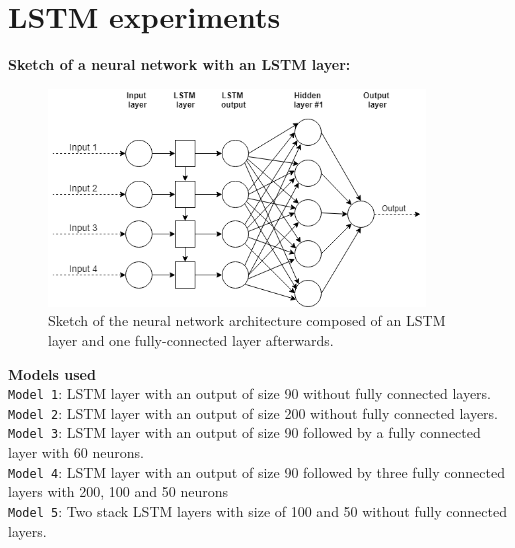 \chapter{LSTM experiments}
\label{annex:lstm-experiments}


\textbf{Sketch of a neural network with an LSTM layer:}
\begin{figure}[h]
    \centering
    \includegraphics[width=10cm]{images/nn-sketch-lstm.png}
    \caption[Sketch of a Neural Network with a LSTM layer]{Sketch of the neural network architecture composed of an LSTM layer and one fully-connected layer afterwards.}
    \label{fig-annex:nn-sketch-lstm}
\end{figure}

\noindent\textbf{Models used}\\
\texttt{Model 1}: LSTM layer with an output of size 90 without  fully connected layers. \\
\texttt{Model 2}: LSTM layer with an output of size 200 without fully connected layers. \\
\texttt{Model 3}: LSTM layer with an output of size 90 followed by a fully connected layer with 60 neurons. \\
\texttt{Model 4}: LSTM layer with an output of size 90 followed by three fully connected layers with 200, 100 and 50 neurons \\
\texttt{Model 5}: Two stack LSTM layers with size of 100 and 50 without fully connected layers. \\



